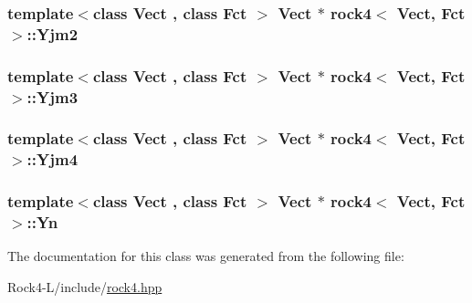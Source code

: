 \hypertarget{classrock4_a53b3b2890e61321bb1b8aeb27fba5525}{
\subsubsection[{Yjm2}]{\setlength{\rightskip}{0pt plus 5cm}template$<$class Vect , class Fct $>$ Vect $\ast$ {\bf rock4}$<$ Vect, Fct $>$\-::Yjm2\hspace{0.3cm}{\ttfamily [private]}}}\label{classrock4_a53b3b2890e61321bb1b8aeb27fba5525}
\hypertarget{classrock4_a6ee1b19f1ce2703d87ad46ef553a9978}{
\subsubsection[{Yjm3}]{\setlength{\rightskip}{0pt plus 5cm}template$<$class Vect , class Fct $>$ Vect $\ast$ {\bf rock4}$<$ Vect, Fct $>$\-::Yjm3\hspace{0.3cm}{\ttfamily [private]}}}\label{classrock4_a6ee1b19f1ce2703d87ad46ef553a9978}
\hypertarget{classrock4_ab48779fb1b2cdbac812c6a994f7120e3}{
\subsubsection[{Yjm4}]{\setlength{\rightskip}{0pt plus 5cm}template$<$class Vect , class Fct $>$ Vect $\ast$ {\bf rock4}$<$ Vect, Fct $>$\-::Yjm4\hspace{0.3cm}{\ttfamily [private]}}}\label{classrock4_ab48779fb1b2cdbac812c6a994f7120e3}
\hypertarget{classrock4_a2bc4f664245341808c8876e55d5073f6}{
\subsubsection[{Yn}]{\setlength{\rightskip}{0pt plus 5cm}template$<$class Vect , class Fct $>$ Vect $\ast$ {\bf rock4}$<$ Vect, Fct $>$\-::Yn\hspace{0.3cm}{\ttfamily [private]}}}\label{classrock4_a2bc4f664245341808c8876e55d5073f6}


The documentation for this class was generated from the following file\-:\begin{DoxyCompactItemize}
\item 
Rock4-\/\-L/include/\hyperlink{Rock4-L_2include_2rock4_8hpp}{rock4.\-hpp}\end{DoxyCompactItemize}
